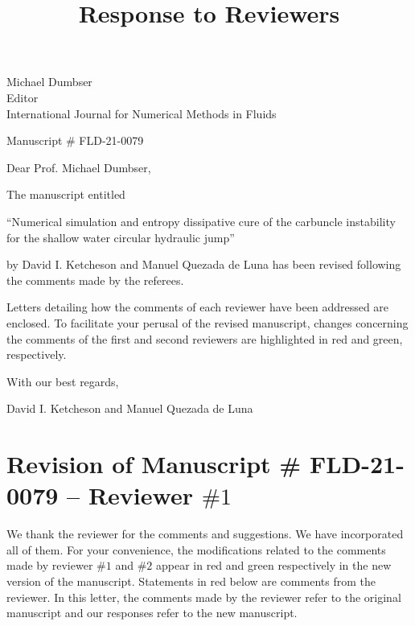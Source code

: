 \documentclass[english,11pt]{article}
\begin{document}
\title{Response to Reviewers}
\maketitle

\vspace{1.5cm}
\noindent
Michael Dumbser \\
Editor \\
International Journal for Numerical Methods in Fluids \\

\vspace{1.5cm}

\noindent
Manuscript \# FLD-21-0079
\vspace{1.5cm}

\noindent
Dear Prof. Michael Dumbser,

\vspace{0.25cm}
\bigskip
The manuscript entitled
\begin{center}
``Numerical simulation and entropy dissipative cure of the carbuncle instability for the shallow water circular hydraulic jump''
\end{center}
by David I. Ketcheson and Manuel Quezada de Luna
has been revised following the comments made by the referees.

\bigskip
Letters detailing how the comments of each reviewer have been
addressed are enclosed. To facilitate your perusal of the revised
manuscript, changes concerning the comments of the first and second
reviewers are highlighted in red and green, respectively.


\vspace{0.25cm}
\bigskip\noindent 
With our best regards,

\vspace{0.5cm}
\bigskip\noindent
David I. Ketcheson and Manuel Quezada de Luna

\newpage
\section*{Revision of Manuscript \# FLD-21-0079 -- Reviewer $\#1$}
We thank the reviewer for the comments and suggestions.
We have incorporated all of them.  For your convenience,
the modifications related to the comments made by reviewer $\#1$ and $\#2$
appear in red and green respectively in the new version of the manuscript. 
Statements in red below are comments from the reviewer.
In this letter, the comments made by the reviewer refer to the original
manuscript and our responses refer to the new manuscript. 
\end{document}
